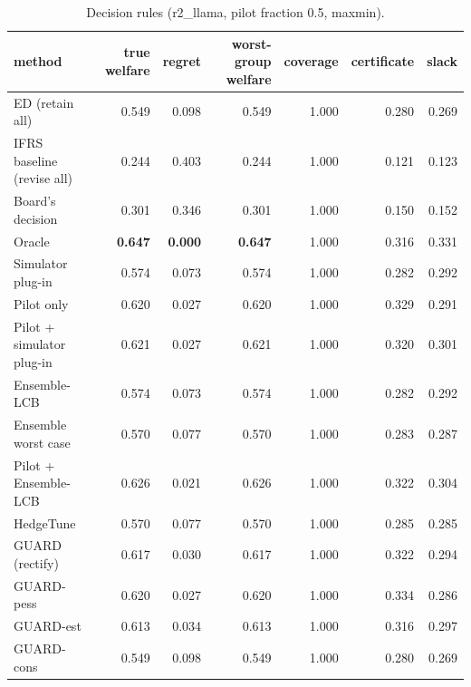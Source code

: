 \begin{table}[t]
\centering
\small
\begin{tabular}{lrrrrrr}
\toprule
method & true welfare & regret & worst-group welfare & coverage & certificate & slack \\
\midrule
ED (retain all) & 0.549 & 0.098 & 0.549 & 1.000 & 0.280 & 0.269 \\
IFRS baseline (revise all) & 0.244 & 0.403 & 0.244 & 1.000 & 0.121 & 0.123 \\
Board's decision & 0.301 & 0.346 & 0.301 & 1.000 & 0.150 & 0.152 \\
Oracle & \textbf{0.647} & \textbf{0.000} & \textbf{0.647} & 1.000 & 0.316 & 0.331 \\
Simulator plug-in & 0.574 & 0.073 & 0.574 & 1.000 & 0.282 & 0.292 \\
Pilot only & 0.620 & 0.027 & 0.620 & 1.000 & 0.329 & 0.291 \\
Pilot + simulator plug-in & 0.621 & 0.027 & 0.621 & 1.000 & 0.320 & 0.301 \\
Ensemble-LCB & 0.574 & 0.073 & 0.574 & 1.000 & 0.282 & 0.292 \\
Ensemble worst case & 0.570 & 0.077 & 0.570 & 1.000 & 0.283 & 0.287 \\
Pilot + Ensemble-LCB & 0.626 & 0.021 & 0.626 & 1.000 & 0.322 & 0.304 \\
HedgeTune & 0.570 & 0.077 & 0.570 & 1.000 & 0.285 & 0.285 \\
GUARD (rectify) & 0.617 & 0.030 & 0.617 & 1.000 & 0.322 & 0.294 \\
GUARD-pess & 0.620 & 0.027 & 0.620 & 1.000 & 0.334 & 0.286 \\
GUARD-est & 0.613 & 0.034 & 0.613 & 1.000 & 0.316 & 0.297 \\
GUARD-cons & 0.549 & 0.098 & 0.549 & 1.000 & 0.280 & 0.269 \\
\bottomrule
\end{tabular}
\caption{Decision rules (r2\_llama, pilot fraction 0.5, maxmin).}
\label{tab:methods-maxmin}
\end{table}
